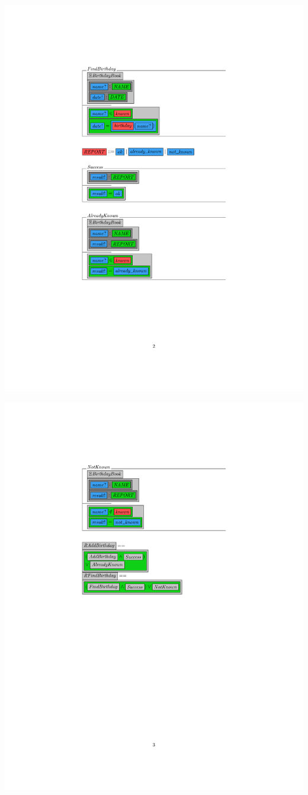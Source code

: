 \noindent \includegraphics[clip, trim=4cm 8cm 4cm 4.2cm]{examples/bb/1comp2.pdf}

\noindent \includegraphics[clip, trim=4cm 8cm 4cm 4.2cm]{examples/bb/1comp3.pdf}

